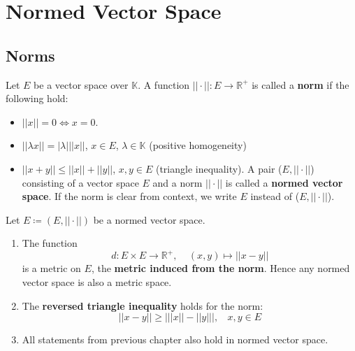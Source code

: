 \chapter{Normed Vector Space}

\section{Norms}

\begin{definition}[Norm]\label{def: norm}
    Let \(E\) be a vector space over \(\mathbb{K}\). A function \(|| \cdot || \colon E \to
    \mathbb{R}^+\) is called a \textbf{norm} if the following hold:
    \begin{itemize}
        \item \( || x || = 0 \Leftrightarrow x = 0\). 
        \item \( || \lambda x|| = |\lambda| || x || \), \(x \in E\), \(\lambda \in \mathbb{K}\)
        (positive homogeneity)
        \item \( || x + y || \leq || x || + || y ||\), \(x, y \in E\) (triangle inequality).
        A pair (\(E, ||\cdot||\)) consisting of a vector space \(E\) and a norm
        \(||\cdot||\) is called a \textbf{normed vector space}. If the norm is clear from context,
        we write \(E\) instead of (\(E, || \cdot||\)).  
    \end{itemize}
\end{definition}

\begin{remark}
    Let \(E \coloneqq \left(E, ||\cdot||\right)\) be a normed vector space. 
    \begin{enumerate}[label=(\alph*)]
        \item The function 
        \[
            d \colon E \times E \to \mathbb{R}^+ , \:\:\:\:\: (x, y) \mapsto ||x-y||  
        \]
        is a metric on \(E\), the \textbf{metric induced from the norm}. Hence any 
        normed vector space is also a metric space. 
        \item The \textbf{reversed triangle inequality} holds for the norm:
        \[
            || x - y || \geq \left |  || x || - || y ||  \right |, \:\:\:\: x,y \in E  
        \]

        \item All statements from previous chapter also hold in normed vector space. 
    \end{enumerate}
\end{remark}

